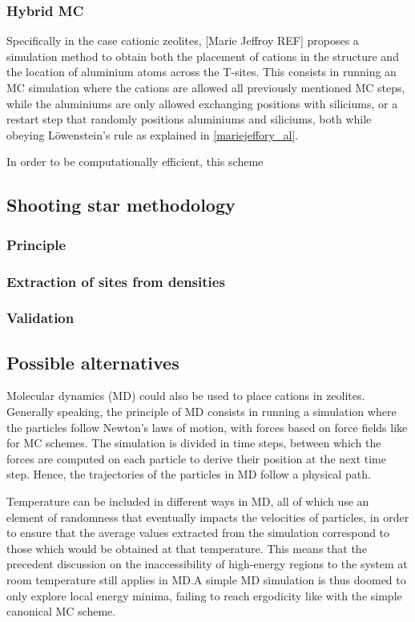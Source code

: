 \documentclass[main.tex]{subfiles}
\begin{document}
\subsubsection{Hybrid MC} %

Specifically in the case cationic zeolites, [Marie Jeffroy REF] proposes a simulation method to obtain both the placement of cations in the structure and the location of aluminium atoms across the T-sites. This consists in running an MC simulation where the cations are allowed all previously mentioned MC steps, while the aluminiums are only allowed exchanging positions with siliciums, or a restart step that randomly positions aluminiums and siliciums, both while obeying L\"owenstein's rule as explained in \autoref{mariejeffory_al}.

In order to be computationally efficient, this scheme 

\subsection{Shooting star methodology}

\subsubsection{Principle}
\subsubsection{Extraction of sites from densities}
\subsubsection{Validation}

\subsection{Possible alternatives}

Molecular dynamics (MD) could also be used to place cations in zeolites. Generally speaking, the principle of MD consists in running a simulation where the particles follow Newton's laws of motion, with forces based on force fields like for MC schemes. The simulation is divided in time steps, between which the forces are computed on each particle to derive their position at the next time step. Hence, the trajectories of the particles in MD follow a physical path.

Temperature can be included in different ways in MD, all of which use an element of randomness that eventually impacts the velocities of particles, in order to ensure that the average values extracted from the simulation correspond to those which would be obtained at that temperature. This means that the precedent discussion on the inaccessibility of high-energy regions to the system at room temperature still applies in MD.\@ A simple MD simulation is thus doomed to only explore local energy minima, failing to reach ergodicity like with the simple canonical MC scheme.
\end{document}
